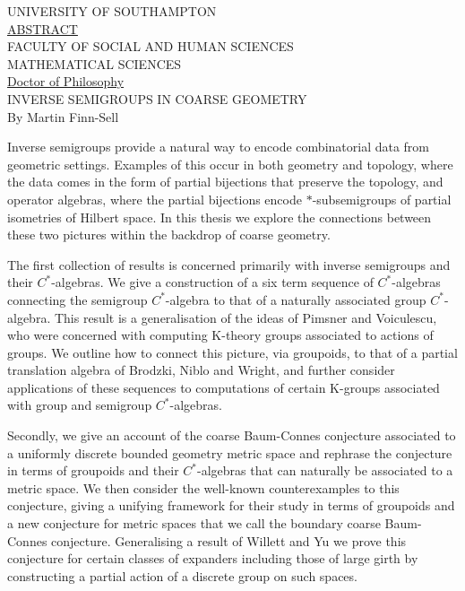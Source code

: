 \begin{center}
UNIVERSITY OF SOUTHAMPTON\\[0.75cm]

\underline{ABSTRACT}\\[0.55cm]

FACULTY OF SOCIAL AND HUMAN SCIENCES\\
MATHEMATICAL SCIENCES\\[0.75cm]

\underline{Doctor of Philosophy}\\[0.55cm]

INVERSE SEMIGROUPS IN COARSE GEOMETRY\\[0.6cm]

By Martin Finn-Sell\\[1.5cm]
\end{center}


Inverse semigroups provide a natural way to encode combinatorial data from geometric settings. Examples of this occur in both geometry and topology, where the data comes in the form of partial bijections that preserve the topology, and operator algebras, where the partial bijections encode $*$-subsemigroups of partial isometries of Hilbert space. In this thesis we explore the connections between these two pictures within the backdrop of coarse geometry.

The first collection of results is concerned primarily with inverse semigroups and their $C^{*}$-algebras. We give a construction of a six term sequence of $C^{*}$-algebras connecting the semigroup $C^{*}$-algebra to that of a naturally associated group $C^{*}$-algebra. This result is a generalisation of the ideas of Pimsner and Voiculescu, who were concerned with computing K-theory groups associated to actions of groups. We outline how to connect this picture, via groupoids, to that of a partial translation algebra of Brodzki, Niblo and Wright, and further consider applications of these sequences to computations of certain K-groups associated with group and semigroup $C^{*}$-algebras.

Secondly, we give an account of the coarse Baum-Connes conjecture associated to a uniformly discrete bounded geometry metric space and rephrase the conjecture in terms of groupoids and their $C^{*}$-algebras that can naturally be associated to a metric space. We then consider the well-known counterexamples to this conjecture, giving a unifying framework for their study in terms of groupoids and a new conjecture for metric spaces that we call the boundary coarse Baum-Connes conjecture. Generalising a result of Willett and Yu we prove this conjecture for certain classes of expanders including those of large girth by constructing a partial action of a discrete group on such spaces.